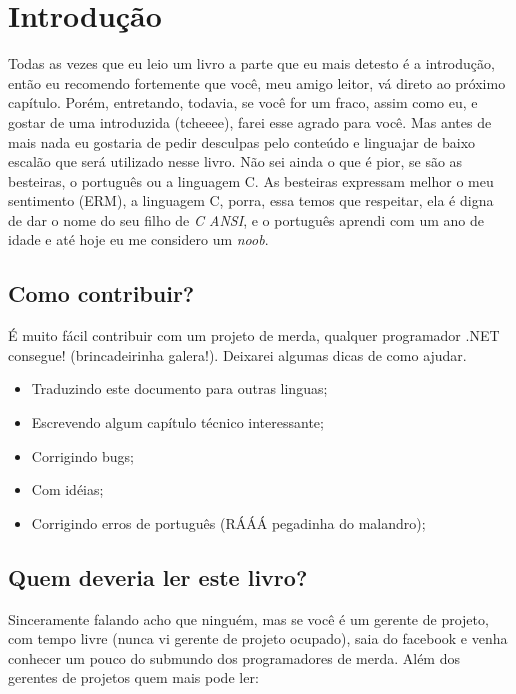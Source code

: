 

\chapter{Introdução}

Todas as vezes que eu leio um livro a parte que eu mais detesto é a introdução, então eu recomendo fortemente que você, meu amigo 
leitor, vá direto ao próximo capítulo. Porém, entretando, todavia, se você for um fraco, assim como eu, e gostar de uma introduzida 
(tcheeee), farei esse agrado para você. Mas antes de mais nada eu gostaria de pedir desculpas pelo conteúdo e linguajar de baixo 
escalão que será utilizado nesse livro. Não sei ainda o que é pior, se são as besteiras, o português ou a linguagem C. As besteiras 
expressam melhor o meu sentimento (ERM), a linguagem C, porra, essa temos que respeitar, ela é digna de dar o nome do seu filho de 
\textit{C ANSI}, e o português aprendi com um ano de idade e até hoje eu me considero um \textit{noob}.


\section{Como contribuir?}

É muito fácil contribuir com um projeto de merda, qualquer programador .NET consegue! (brincadeirinha galera!). 
Deixarei algumas dicas de como ajudar.

\begin{itemize}
 \item Traduzindo este documento para outras linguas;
 \item Escrevendo algum capítulo técnico interessante;
 \item Corrigindo bugs;
 \item Com idéias;
 \item Corrigindo erros de português (RÁÁÁ pegadinha do malandro);
\end{itemize}

\section{Quem deveria ler este livro?}

Sinceramente falando acho que ninguém, mas se você é um gerente de projeto, com tempo livre (nunca vi gerente de projeto ocupado), 
saia do facebook e venha conhecer um pouco do submundo dos programadores de merda. Além dos gerentes de projetos quem mais pode ler:

